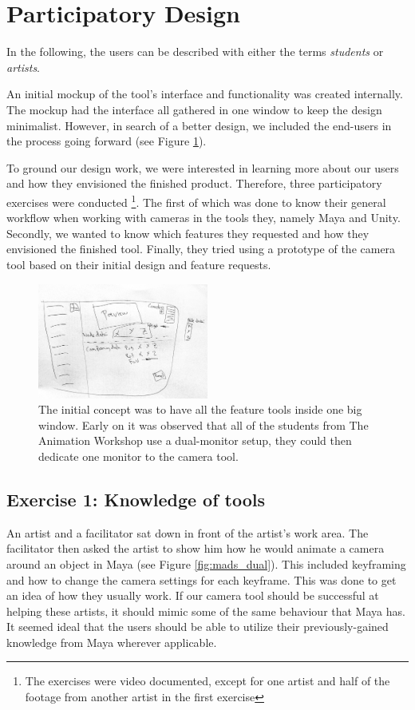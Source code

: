 \section{Participatory Design}
In the following, the users can be described with either the terms \textit{students} or \textit{artists}.




An initial mockup of the tool's interface and functionality was created internally. The mockup had the interface all gathered in one window to keep the design minimalist. However, in search of a better design, we included the end-users in the process going forward (see Figure \ref{fig:mockup}).

To ground our design work, we were interested in learning more about our users and how they envisioned the finished product. Therefore, three participatory exercises were conducted \footnote{The exercises were video documented, except for one artist and half of the footage from another artist in the first exercise}. The first of which was done to know their general workflow when working with cameras in the tools they, namely Maya and Unity. Secondly, we wanted to know which features they requested and how they envisioned the finished tool. Finally, they tried using a prototype of the camera tool based on their initial design and feature requests.


\begin{figure}[htbp]
\centering
\includegraphics[width=0.50\textwidth]{Pics/InitialMockup}
\caption{The initial concept was to have all the feature tools inside one big window. Early on it was observed that all of the students from The Animation Workshop use a dual-monitor setup, they could then dedicate one monitor to the camera tool.}
\label{fig:mockup}
\end{figure}

\subsection{Exercise 1: Knowledge of tools} \label{exerciseOne}
An artist and a facilitator sat down in front of the artist's work area. The facilitator then asked the artist to show him how he would animate a camera around an object in Maya (see Figure \ref{fig:mads_dual}). This included keyframing and how to change the camera settings for each keyframe. This was done to get an idea of how they usually work. If our camera tool should be successful at helping these artists, it should mimic some of the same behaviour that Maya has. It seemed ideal that the users should be able to utilize their previously-gained knowledge from Maya wherever applicable.

